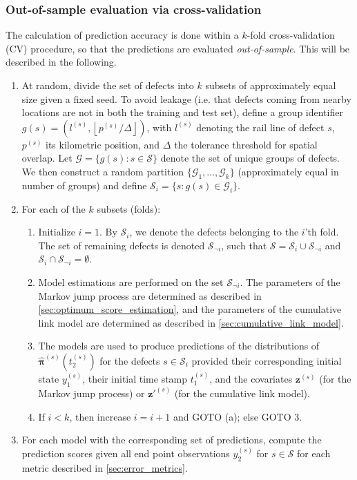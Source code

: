 \documentclass{article}
\begin{document}
\subsubsection{Out-of-sample evaluation via cross-validation} \label{sec:CV}
The calculation of prediction accuracy is done within a $k$-fold cross-validation (CV) procedure, so that the predictions are evaluated \textit{out-of-sample}. This will be described in the following.

\begin{enumerate}
    \item At random, divide the set of defects into $k$ subsets of approximately equal size given a fixed seed. To avoid leakage (i.e. that defects coming from nearby locations are not in both the training and test set), define a group identifier $g(s) = (l^{(s)},\left \lfloor{p^{(s)}/\Delta}\right \rfloor )$, with $l^{(s)}$ denoting the rail line of defect $s$, $p^{(s)}$ its kilometric position, and $\Delta$ the tolerance threshold for spatial overlap. Let $\mathcal{G} = \{g(s) : s \in \mathcal S\}$ denote the set of unique groups of defects. We then construct a random partition $\{\mathcal{G}_1, \dots, \mathcal{G}_k\}$ (approximately equal in number of groups) and define $\mathcal S_i = \{s : g(s) \in \mathcal G_i\}$. 
    \item For each of the $k$ subsets (folds):
    \begin{enumerate}
        \item Initialize $i = 1$. By $\mathcal{S}_i$, we denote the defects belonging to the $i$'th fold. The set of remaining defects is denoted $\mathcal{S}_{\neg i}$, such that $\mathcal{S} = \mathcal{S}_i \cup \mathcal{S}_{\neg i}$ and $\mathcal{S}_i \cap \mathcal{S}_{\neg i} = \emptyset$.
        \item Model estimations are performed on the set $\mathcal{S}_{\neg i}$. The parameters of the Markov jump process are determined as described in \cref{sec:optimum_score_estimation}, and the parameters of the cumulative link model are determined as described in \cref{sec:cumulative_link_model}.
        \item The models are used to produce predictions of the distributions of $\widehat{\bm{\pi}}^{(s)}\left( t_2^{(s)}\right)$ for the defects $s \in \mathcal{S}_i$ provided their corresponding initial state $y_1^{(s)}$, their initial time stamp $t_1^{(s)}$, and the covariates $\bm{z}^{(s)}$ (for the Markov jump process) or $\bm{z}'^{(s)}$ (for the cumulative link model).
        \item If $i < k$, then increase $i = i + 1$ and GOTO (a); else GOTO 3.
    \end{enumerate}
    \item For each model with the corresponding set of predictions, compute the prediction scores given all end point observations $y_2^{(s)}$ for $s \in \mathcal{S}$ for each metric described in \cref{sec:error_metrics}.
\end{enumerate}
\end{document}
